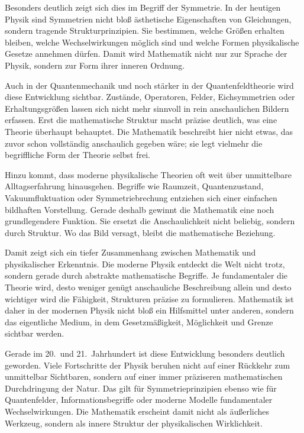 Besonders deutlich zeigt sich dies im Begriff der Symmetrie. In der heutigen Physik sind Symmetrien nicht bloß ästhetische Eigenschaften von Gleichungen, sondern tragende Strukturprinzipien. Sie bestimmen, welche Größen erhalten bleiben, welche Wechselwirkungen möglich sind und welche Formen physikalische Gesetze annehmen dürfen. Damit wird Mathematik nicht nur zur Sprache der Physik, sondern zur Form ihrer inneren Ordnung.

Auch in der Quantenmechanik und noch stärker in der Quantenfeldtheorie wird diese Entwicklung sichtbar. Zustände, Operatoren, Felder, Eichsymmetrien oder Erhaltungsgrößen lassen sich nicht mehr sinnvoll in rein anschaulichen Bildern erfassen. Erst die mathematische Struktur macht präzise deutlich, was eine Theorie überhaupt behauptet. Die Mathematik beschreibt hier nicht etwas, das zuvor schon vollständig anschaulich gegeben wäre; sie legt vielmehr die begriffliche Form der Theorie selbst frei.

Hinzu kommt, dass moderne physikalische Theorien oft weit über unmittelbare Alltagserfahrung hinausgehen. Begriffe wie Raumzeit, Quantenzustand, Vakuumfluktuation oder Symmetriebrechung entziehen sich einer einfachen bildhaften Vorstellung. Gerade deshalb gewinnt die Mathematik eine noch grundlegendere Funktion. Sie ersetzt die Anschaulichkeit nicht beliebig, sondern durch Struktur. Wo das Bild versagt, bleibt die mathematische Beziehung.

Damit zeigt sich ein tiefer Zusammenhang zwischen Mathematik und physikalischer Erkenntnis. Die moderne Physik entdeckt die Welt nicht trotz, sondern gerade durch abstrakte mathematische Begriffe. Je fundamentaler die Theorie wird, desto weniger genügt anschauliche Beschreibung allein und desto wichtiger wird die Fähigkeit, Strukturen präzise zu formulieren. Mathematik ist daher in der modernen Physik nicht bloß ein Hilfsmittel unter anderen, sondern das eigentliche Medium, in dem Gesetzmäßigkeit, Möglichkeit und Grenze sichtbar werden.

Gerade im 20.~und 21.~Jahrhundert ist diese Entwicklung besonders deutlich geworden. Viele Fortschritte der Physik beruhen nicht auf einer Rückkehr zum unmittelbar Sichtbaren, sondern auf einer immer präziseren mathematischen Durchdringung der Natur. Das gilt für Symmetrieprinzipien ebenso wie für Quantenfelder, Informationsbegriffe oder moderne Modelle fundamentaler Wechselwirkungen. Die Mathematik erscheint damit nicht als äußerliches Werkzeug, sondern als innere Struktur der physikalischen Wirklichkeit.

